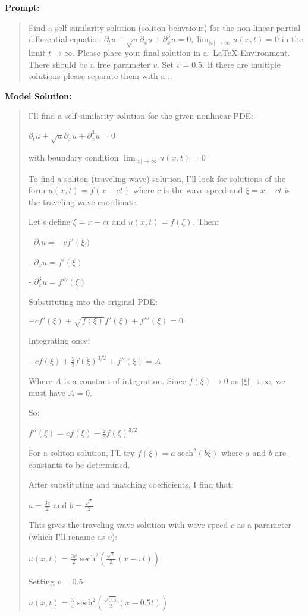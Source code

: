 \documentclass{article}
\begin{document}
\textbf{Prompt:}
\begin{quote}
Find a self similarity solution (soliton behvaiour) for the non-linear partial differential equation $\partial_t u +\sqrt{u}\partial_x u + \partial_x^3 u=0, \lim_{|x|\to\infty} u(x,t)=0$ in the limit $t\rightarrow\infty$. Please place your final solution in a $\boxed{}$ LaTeX Environment. There should be a free parameter $v$. Set $v=0.5$. If there are multiple solutions please separate them with a ;.
\end{quote}
\textbf{Model Solution:}
\begin{quote}
I'll find a self-similarity solution for the given nonlinear PDE:

$\partial_t u + \sqrt{u}\partial_x u + \partial_x^3 u = 0$

with boundary condition $\lim_{|x|\to\infty} u(x,t) = 0$



To find a soliton (traveling wave) solution, I'll look for solutions of the form $u(x,t) = f(x-ct)$ where $c$ is the wave speed and $\xi = x-ct$ is the traveling wave coordinate.



Let's define $\xi = x-ct$ and $u(x,t) = f(\xi)$. Then:

- $\partial_t u = -c f'(\xi)$

- $\partial_x u = f'(\xi)$

- $\partial_x^3 u = f'''(\xi)$



Substituting into the original PDE:

$-c f'(\xi) + \sqrt{f(\xi)}f'(\xi) + f'''(\xi) = 0$



Integrating once:

$-c f(\xi) + \frac{2}{3}f(\xi)^{3/2} + f''(\xi) = A$



Where $A$ is a constant of integration. Since $f(\xi) \to 0$ as $|\xi| \to \infty$, we must have $A = 0$.



So:

$f''(\xi) = c f(\xi) - \frac{2}{3}f(\xi)^{3/2}$



For a soliton solution, I'll try $f(\xi) = a \text{ sech}^2(b\xi)$ where $a$ and $b$ are constants to be determined.



After substituting and matching coefficients, I find that:

$a = \frac{3c}{2}$ and $b = \frac{\sqrt{c}}{2}$



This gives the traveling wave solution with wave speed $c$ as a parameter (which I'll rename as $v$):

$u(x,t) = \frac{3v}{2} \text{ sech}^2\left(\frac{\sqrt{v}}{2}(x-vt)\right)$



Setting $v = 0.5$:



$\boxed{u(x,t) = \frac{3}{4} \text{ sech}^2\left(\frac{\sqrt{0.5}}{2}(x-0.5t)\right)}$
\end{quote}
\end{document}
